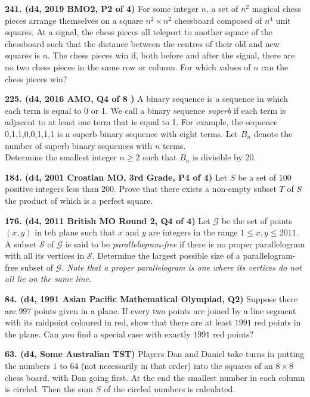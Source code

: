 \documentclass{article}
\begin{document}
        \textbf{241. (\color{red}d4\color{black}, 2019 BMO2, P2 of 4)} For some integer \(n\), a set of \(n^2\) magical chess pieces arrange themselves on a square \(n^2 \times n^2\) chessboard composed of \(n^4\) unit squares. At a signal, the chess pieces all teleport to another square of the chessboard such that the distance between the centres of their old and new squares is \(n\). The chess pieces win if, both before and after the signal, there are no two chess pieces in the same row or column. For which values of \(n\) can the chess pieces win?

        \textbf{225. (\color{red}d4\color{black}, 2016 AMO, Q4 of 8 )} A binary sequence is a sequence in which each term is equal to 0 or 1. We call a binary sequence \textit{superb} if each term is adjacent to at least one term that is equal to 1. For example, the sequence 0,1,1,0,0,1,1,1 is a superb binary sequence with eight terms. Let $B_n$ denote the number of superb binary sequences with $n$ terms. \\

        Determine the smallest integer $n \geq 2$ such that $B_n$ is divisible by 20.

        \textbf{184. (\color{red}d4\color{black}, 2001 Croatian MO, 3rd Grade, P4 of 4)} Let \(S\) be a set of 100 positive integers less than 200. Prove that there exists a non-empty subset \(T\) of \(S\) the product of which is a perfect square.

        \textbf{176. (\color{red}d4\color{black}, 2011 British MO Round 2, Q4 of 4)} Let $\mathcal{G}$ be the set of points $(x, y)$ in teh plane such that $x$ and $y$ are integers in the range $1 \leq x, y \leq 2011$. A subset $\mathcal{S}$ of $\mathcal{G}$ is said to be \textit{parallelogram-free} if there is no proper parallelogram with all its vertices in $\mathcal{S}$. Determine the largest possible size of a parallelogram-free subset of $\mathcal{G}$. \textit{Note that a proper parallelogram is one where its vertices do not all lie on the same line.}

        \textbf{84. (\color{red}d4\color{black}, 1991 Asian Pacific Mathematical Olympiad, Q2)} Suppose there are $997$ points given in a plane. If every two points are joined by a line segment with its midpoint coloured in red, show that there are at least $1991$ red points in the plane. Can you find a special case with exactly $1991$ red points?

        \textbf{63. (\color{red}d4\color{black}, Some Australian TST)} Players Dan and Daniel take turns in putting the numbers $1$ to $64$ (not necessarily in that order) into the squares of an $8 \times 8$ chess board, with Dan going first. At the end the smallest number in each column is circled. Then the sum $S$ of the circled numbers is calculated.
\end{document}
